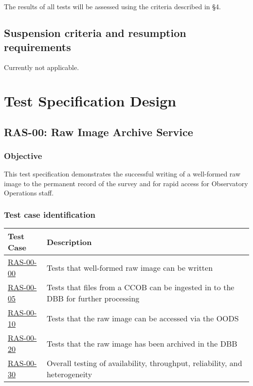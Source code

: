 \documentclass[DM,lsstdraft,STS,toc]{lsstdoc}
\begin{document}
The results of all tests will be assessed using the criteria described in
 \S4.




\subsection{Suspension criteria and resumption requirements}
\label{suspension}

Currently not applicable.


\section{Test Specification Design}
\label{sec:Test Specification Design}
\subsection{RAS-00: Raw Image Archive Service}


\subsubsection{Objective}
This test specification demonstrates the successful writing of a
well-formed raw image to the permanent record of the survey and
for rapid access for Observatory Operations staff.


\subsubsection{Test case identification}


\begin{longtable} {|p{}|p{}|}\hline
\textbf{Test Case} & \textbf{Description} \\\hline
\hyperref[ras-00-00]{RAS-00-00} & Tests that well-formed raw image can be written \\\hline
\hyperref[ras-00-05]{RAS-00-05} & Tests that files from a CCOB can be ingested in to the DBB for further processing \\\hline
\hyperref[ras-00-10]{RAS-00-10} & Tests that the raw image can be accessed via the OODS \\\hline
\hyperref[ras-00-20]{RAS-00-20} & Tests that the raw image has been archived in the DBB \\\hline
\hyperref[ras-00-30]{RAS-00-30} & Overall testing of availability, throughput, reliability, and heterogeneity \\\hline
\end{longtable}
\end{document}
